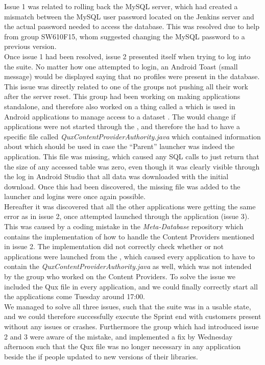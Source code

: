 Issue 1 was related to rolling back the MySQL server, which had created a mismatch between the MySQL user password located on the Jenkins server and the actual password needed to access the database. This was resolved due to help from group SW610F15, whom suggested changing the MySQL password to a previous version. \\

Once issue 1 had been resolved, issue 2 presented itself when trying to log into the \giraf suite. No matter how one attempted to login, an Android Toast (small message) would be displayed saying that no profiles were present in the database. This issue was directly related to one of the groups not pushing all their work after the server reset. This group had been working on making applications standalone, and therefore also worked on a thing called a  which is used in Android applications to manage access to a dataset \parencite{android_content_provider}. The  would change if applications were not started through the \giraf \launcher, and therefore the \launcher had to have a specific file called \emph{QuxContentProviderAuthority.java} which contained information about which  should be used in case the ``Parent'' launcher was indeed the \giraf \launcher application. This file was missing, which caused any SQL calls to just return that the size of any accessed table was zero, even though it was clearly visible through the log in Android Studio that all data was downloaded with the initial download. Once this had been discovered, the missing file was added to the launcher and logins were once again possible. \\

Hereafter it was discovered that all the other applications were getting the same error as in issue 2, once attempted launched through the \launcher application (issue 3). This was caused by a coding mistake in the \emph{Meta-Database} repository which contains the implementation of how to handle the Content Providers mentioned in issue 2. The implementation did not correctly check whether or not applications were launched from the \giraf \launcher, which caused every application to have to contain the \emph{QuxContentProviderAuthority.java} as well, which was not intended by the group who worked on the Content Providers. To solve the issue we included the Qux file in every application, and we could finally correctly start all the applications come Tuesday around 17:00. \\

We managed to solve all three issues, such that the \giraf suite was in a usable state, and we could therefore successfully execute the Sprint end with customers present without any issues or crashes. Furthermore the group which had introduced issue 2 and 3 were aware of the mistake, and implemented a fix by Wednesday afternoon such that the Qux file was no longer necessary in any application beside the \launcher if people updated to new versions of their libraries.